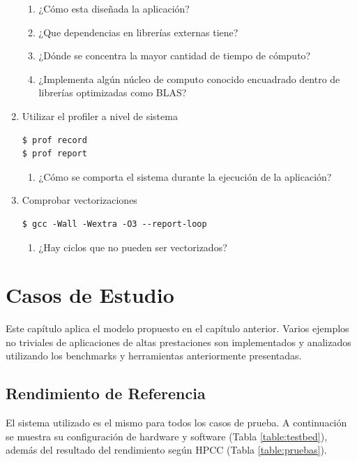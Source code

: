 \documentclass[a4paper]{report}
\begin{document}
\begin{enumerate}
\begin{enumerate}
\item ¿Cómo esta diseñada la aplicación?
\item ¿Que dependencias en librerías externas tiene?
\item ¿Dónde se concentra la mayor cantidad de tiempo de cómputo?
\item ¿Implementa algún núcleo de computo conocido encuadrado dentro de librerías optimizadas como BLAS?
\end{enumerate}

\item Utilizar el profiler a nivel de sistema

\begin{lstlisting}
$ prof record
$ prof report
\end{lstlisting}

\begin{enumerate}
\item ¿Cómo se comporta el sistema durante la ejecución de la aplicación?
\end{enumerate}

\item Comprobar vectorizaciones

\begin{lstlisting}
$ gcc -Wall -Wextra -O3 --report-loop
\end{lstlisting}

\begin{enumerate}
\item ¿Hay ciclos que no pueden ser vectorizados?
\end{enumerate}

\end{enumerate}

\chapter{Casos de Estudio}

Este capítulo aplica el modelo propuesto en el capítulo anterior. Varios ejemplos no triviales de aplicaciones de altas prestaciones son implementados
y analizados utilizando los benchmarks y herramientas anteriormente presentadas.

\section{Rendimiento de Referencia}

El sistema utilizado es el mismo para todos los casos de prueba. A continuación se muestra su configuración de hardware y software (Tabla \ref{table:testbed}), además del resultado del rendimiento según HPCC (Tabla \ref{table:pruebas}).
\end{document}
